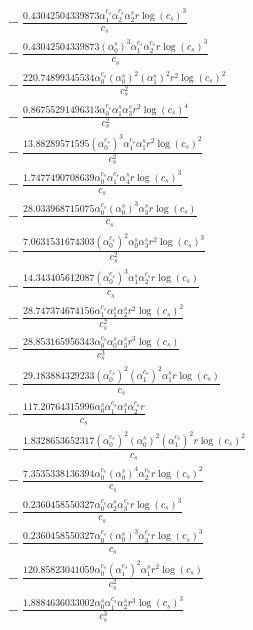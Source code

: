 \documentclass[10pt]{article}
\begin{document}
\begin{align*}
&{}  - \frac{0.43042504339873 \alpha_{1}^{c_s} \alpha_{2}^{c_s} \alpha_{2}^s r \log{\left(c_{s} \right)}^{3}}{c_{s}} \\
&{}  - \frac{0.43042504339873 \left(\alpha_{0}^s\right)^{3} \alpha_{1}^{c_s} \alpha_{2}^{c_s} r \log{\left(c_{s} \right)}^{3}}{c_{s}} \\
&{}  - \frac{220.74899345534 \alpha_{0}^{c_s} \left(\alpha_{0}^s\right)^{2} \left(\alpha_{1}^s\right)^{2} r^{2} \log{\left(c_{s} \right)}^{2}}{c_{s}^{2}} \\
&{}  - \frac{0.86755291496313 \alpha_{0}^{c_s} \alpha_{1}^s \alpha_{3}^s r^{2} \log{\left(c_{s} \right)}^{4}}{c_{s}^{2}} \\
&{}  - \frac{13.88289571595 \left(\alpha_{0}^{c_s}\right)^{3} \alpha_{1}^{c_s} \alpha_{1}^s r^{2} \log{\left(c_{s} \right)}^{2}}{c_{s}^{2}} \\
&{}  - \frac{1.7477490708639 \alpha_{0}^{c_s} \alpha_{1}^{c_s} \alpha_{4}^s r \log{\left(c_{s} \right)}^{3}}{c_{s}} \\
&{}  - \frac{28.033968715075 \alpha_{0}^{c_s} \left(\alpha_{0}^s\right)^{3} \alpha_{3}^s r \log{\left(c_{s} \right)}}{c_{s}} \\
&{}  - \frac{7.0631531674303 \left(\alpha_{0}^{c_s}\right)^{2} \alpha_{0}^s \alpha_{3}^s r^{2} \log{\left(c_{s} \right)}^{3}}{c_{s}^{2}} \\
&{}  - \frac{14.343405612087 \left(\alpha_{0}^{c_s}\right)^{3} \alpha_{1}^s \alpha_{2}^{c_s} r \log{\left(c_{s} \right)}}{c_{s}} \\
&{}  - \frac{28.747374674156 \alpha_{1}^{c_s} \alpha_{1}^s \alpha_{2}^s r^{2} \log{\left(c_{s} \right)}^{2}}{c_{s}^{2}} \\
&{}  - \frac{28.853165956343 \alpha_{0}^{c_s} \alpha_{0}^s \alpha_{3}^s r^{3} \log{\left(c_{s} \right)}}{c_{s}^{3}} \\
&{}  - \frac{29.183884329233 \left(\alpha_{0}^{c_s}\right)^{2} \left(\alpha_{1}^{c_s}\right)^{2} \alpha_{1}^s r \log{\left(c_{s} \right)}}{c_{s}} \\
&{}  - \frac{117.20764315996 \alpha_{0}^s \alpha_{1}^{c_s} \alpha_{1}^s \alpha_{2}^{c_s} r}{c_{s}} \\
&{}  - \frac{1.8328653652317 \left(\alpha_{0}^{c_s}\right)^{2} \left(\alpha_{0}^s\right)^{2} \left(\alpha_{1}^{c_s}\right)^{2} r \log{\left(c_{s} \right)}^{2}}{c_{s}} \\
&{}  - \frac{7.3535338136394 \alpha_{0}^{c_s} \left(\alpha_{0}^s\right)^{4} \alpha_{2}^{c_s} r \log{\left(c_{s} \right)}^{2}}{c_{s}} \\
&{}  - \frac{0.2360458550327 \alpha_{0}^{c_s} \alpha_{2}^s \alpha_{3}^{c_s} r \log{\left(c_{s} \right)}^{3}}{c_{s}} \\
&{}  - \frac{0.2360458550327 \alpha_{0}^{c_s} \left(\alpha_{0}^s\right)^{3} \alpha_{3}^{c_s} r \log{\left(c_{s} \right)}^{3}}{c_{s}} \\
&{}  - \frac{120.85823041059 \alpha_{0}^{c_s} \left(\alpha_{1}^{c_s}\right)^{2} \alpha_{1}^s r^{2} \log{\left(c_{s} \right)}}{c_{s}^{2}} \\
&{}  - \frac{1.8884636033002 \alpha_{0}^s \alpha_{1}^{c_s} \alpha_{2}^s r^{3} \log{\left(c_{s} \right)}^{3}}{c_{s}^{3}}
\end{align*}
\end{document}
